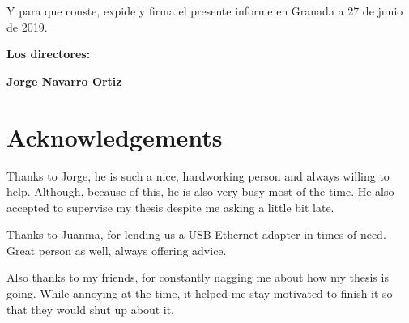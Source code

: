 \vspace{0.5cm}

Y para que conste, expide y firma el presente informe en Granada a 27 de junio de 2019.

\vspace{1cm}

\textbf{Los directores:}

\vspace{5cm}

\noindent \textbf{Jorge Navarro Ortiz \ \ \ \ \ }

\chapter*{Acknowledgements}
\thispagestyle{empty}

       \vspace{1cm}


Thanks to Jorge, he is such a nice, hardworking person and always willing to help. Although, because of this, he is also very busy most of the time. He also accepted to supervise my thesis despite me asking a little bit late.

Thanks to Juanma, for lending us a USB-Ethernet adapter in times of need. Great person as well, always offering advice.

Also thanks to my friends, for constantly nagging me about how my thesis is going. While annoying at the time, it helped me stay motivated to finish it so that they would shut up about it. 
